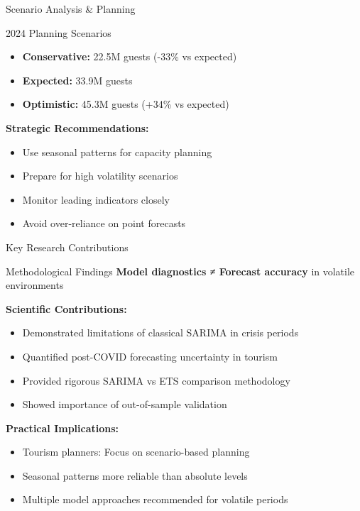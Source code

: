 \documentclass[10pt]{beamer}
\begin{document}
\begin{frame}{Scenario Analysis \& Planning}
\begin{block}{2024 Planning Scenarios}
\begin{itemize}
\item \textbf{Conservative:} 22.5M guests (-33\% vs expected)
\item \textbf{Expected:} 33.9M guests 
\item \textbf{Optimistic:} 45.3M guests (+34\% vs expected)
\end{itemize}
\end{block}

\textbf{Strategic Recommendations:}
\begin{itemize}
\item Use seasonal patterns for capacity planning
\item Prepare for high volatility scenarios
\item Monitor leading indicators closely
\item Avoid over-reliance on point forecasts
\end{itemize}
\end{frame}

\begin{frame}{Key Research Contributions}
\begin{alertblock}{Methodological Findings}
\textbf{Model diagnostics ≠ Forecast accuracy} in volatile environments
\end{alertblock}

\textbf{Scientific Contributions:}
\begin{itemize}
\item Demonstrated limitations of classical SARIMA in crisis periods
\item Quantified post-COVID forecasting uncertainty in tourism
\item Provided rigorous SARIMA vs ETS comparison methodology
\item Showed importance of out-of-sample validation
\end{itemize}

\textbf{Practical Implications:}
\begin{itemize}
\item Tourism planners: Focus on scenario-based planning
\item Seasonal patterns more reliable than absolute levels
\item Multiple model approaches recommended for volatile periods
\end{itemize}
\end{frame}
\end{document}
